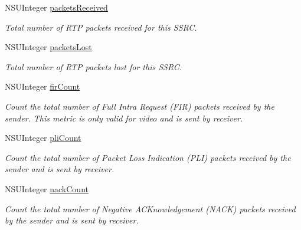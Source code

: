 \begin{DoxyCompactItemize}
N\+S\+U\+Integer \hyperlink{interface_c_c_video_receive_status_a144a42ba374c449d6e3f359e5d77ba05}{packets\+Received}
\begin{DoxyCompactList}\small\item\em Total number of R\+TP packets received for this S\+S\+RC. \end{DoxyCompactList}\item 
\mbox{\label{interface_c_c_video_receive_status_a4cb82bbb8fcaac1c5bfdfef66ea650e8}} 
N\+S\+U\+Integer \hyperlink{interface_c_c_video_receive_status_a4cb82bbb8fcaac1c5bfdfef66ea650e8}{packets\+Lost}
\begin{DoxyCompactList}\small\item\em Total number of R\+TP packets lost for this S\+S\+RC. \end{DoxyCompactList}\item 
\mbox{\label{interface_c_c_video_receive_status_a507f613ce2d4a64db20680ea3636588d}} 
N\+S\+U\+Integer \hyperlink{interface_c_c_video_receive_status_a507f613ce2d4a64db20680ea3636588d}{fir\+Count}
\begin{DoxyCompactList}\small\item\em Count the total number of Full Intra Request (F\+IR) packets received by the sender. This metric is only valid for video and is sent by receiver. \end{DoxyCompactList}\item 
\mbox{\label{interface_c_c_video_receive_status_aaef6eba5c940ce491b1097acf41c0774}} 
N\+S\+U\+Integer \hyperlink{interface_c_c_video_receive_status_aaef6eba5c940ce491b1097acf41c0774}{pli\+Count}
\begin{DoxyCompactList}\small\item\em Count the total number of Packet Loss Indication (P\+LI) packets received by the sender and is sent by receiver. \end{DoxyCompactList}\item 
\mbox{\label{interface_c_c_video_receive_status_a364391f9447162f683271d6baaf22caf}} 
N\+S\+U\+Integer \hyperlink{interface_c_c_video_receive_status_a364391f9447162f683271d6baaf22caf}{nack\+Count}
\begin{DoxyCompactList}\small\item\em Count the total number of Negative A\+C\+Knowledgement (N\+A\+CK) packets received by the sender and is sent by receiver. \end{DoxyCompactList}\item 

\end{DoxyCompactItemize}
